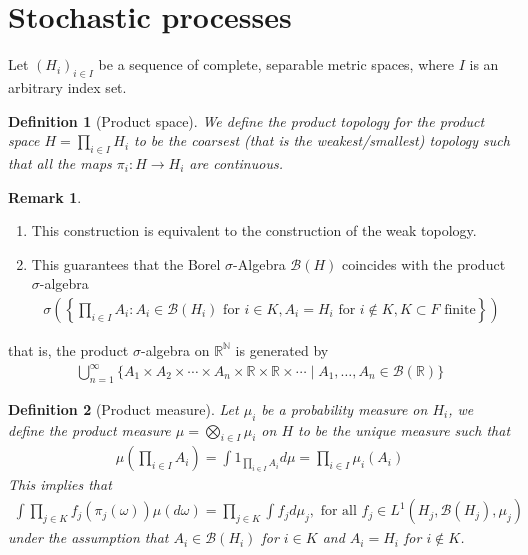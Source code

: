\documentclass[11pt,a4paper, final]{article}
\newtheorem{defn}{Definition}[section]
\theoremstyle{definition}
\newtheorem{rem}{Remark}[section]
\begin{document}
\section{Stochastic processes}
Let $(H_i)_{i \in I}$ be a sequence of complete, separable metric spaces, where $I$ is an arbitrary index set.
\begin{defn}[Product space] We define the product topology for the product space $H= \prod_{i \in I} H_i$ to be the coarsest (that is the weakest/smallest) topology such that all the maps $\pi_i: H \to H_i$ are continuous. 
\end{defn}
\begin{rem} \ \begin{enumerate}
\item This construction is equivalent to the construction of the weak topology. 
\item This guarantees that the Borel $\sigma$-Algebra $\mathcal{B}(H)$ coincides with the product $\sigma$-algebra
\begin{align*}
\sigma \left( \left\{ \prod_{i \in I} A_i : A_i \in \mathcal{B}(H_i) \text{ for } i \in K, A_i = H_i \text{ for } i \notin K, K \subset F \text{ finite} \right\} \right) 
\end{align*}
\end{enumerate}
that is, the product $\sigma$-algebra on $\mathbb{R}^\mathbb{N}$ is generated by 
\begin{align*}
\bigcup_{n=1}^\infty \{ A_1 \times A_2 \times \cdots \times A_n \times \mathbb{R} \times \mathbb{R} \times \cdots \mid A_1, \dots , A_n \in \mathcal{B}(\mathbb{R}) \} 
\end{align*}
\end{rem}
\begin{defn}[Product measure] Let $\mu_i$ be a probability measure on $H_i$, we define the product measure $\mu = \bigotimes_{i \in I} \mu_i$ on $H$ to be the unique measure such that 
\begin{align*}
\mu \left( \prod_{i \in I} A_i \right) = \int 1_{ \prod_{i \in I} A_i } d \mu = \prod_{i \in I} \mu_i (A_i) 
\end{align*}
This implies that 
\begin{align*}
\int \prod_{j \in K} f_j ( \pi_j ( \omega)) \mu (d \omega) = \prod_{j \in K} \int f_j d \mu_j, \text{ for all } f_j \in L^1(H_j , \mathcal{B}(H_j), \mu_j) 
\end{align*}
under the assumption that $A_i \in \mathcal{B}(H_i)$ for $i \in K$ and $A_i=H_i$ for $i \notin K$. 
\end{defn}
\end{document}
